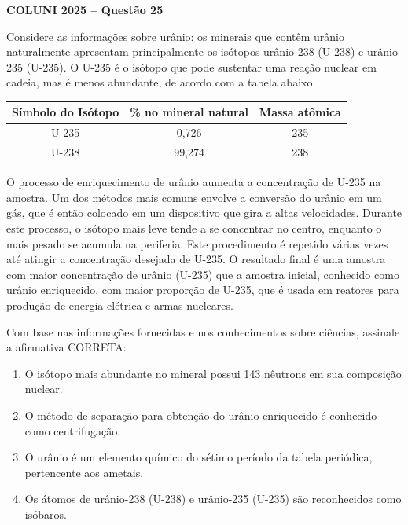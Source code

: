 \textbf{COLUNI 2025 -- Questão 25}\par\medskip Considere as informações sobre urânio: os minerais que contêm urânio naturalmente apresentam principalmente os isótopos urânio-238 (U-238) e urânio-235 (U-235). O U-235 é o isótopo que pode sustentar uma reação nuclear em cadeia, mas é menos abundante, de acordo com a tabela abaixo.

\begin{center}
\begin{tabular}{|c|c|c|}
\hline
Símbolo do Isótopo & \% no mineral natural & Massa atômica \\
\hline
U-235 & 0,726 & 235 \\
U-238 & 99,274 & 238 \\
\hline
\end{tabular}
\end{center}

O processo de enriquecimento de urânio aumenta a concentração de U-235 na amostra. Um dos métodos mais comuns envolve a conversão do urânio em um gás, que é então colocado em um dispositivo que gira a altas velocidades. Durante este processo, o isótopo mais leve tende a se concentrar no centro, enquanto o mais pesado se acumula na periferia. Este procedimento é repetido várias vezes até atingir a concentração desejada de U-235. O resultado final é uma amostra com maior concentração de urânio (U-235) que a amostra inicial, conhecido como urânio enriquecido, com maior proporção de U-235, que é usada em reatores para produção de energia elétrica e armas nucleares.

Com base nas informações fornecidas e nos conhecimentos sobre ciências, assinale a afirmativa CORRETA:
\begin{enumerate}
\item O isótopo mais abundante no mineral possui 143 nêutrons em sua composição nuclear.
\item O método de separação para obtenção do urânio enriquecido é conhecido como centrifugação.
\item O urânio é um elemento químico do sétimo período da tabela periódica, pertencente aos ametais.
\item Os átomos de urânio-238 (U-238) e urânio-235 (U-235) são reconhecidos como isóbaros.
\end{enumerate}
